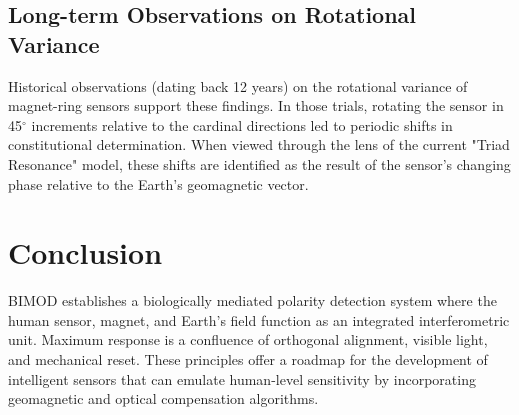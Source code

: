 \documentclass[12pt]{article}
\begin{document}
\subsection{Long-term Observations on Rotational Variance}
Historical observations (dating back 12 years) on the rotational variance of magnet-ring sensors support these findings. In those trials, rotating the sensor in 45$^\circ$ increments relative to the cardinal directions led to periodic shifts in constitutional determination. When viewed through the lens of the current "Triad Resonance" model, these shifts are identified as the result of the sensor's changing phase relative to the Earth's geomagnetic vector.

\section{Conclusion}
BIMOD establishes a biologically mediated polarity detection system where the human sensor, magnet, and Earth's field function as an integrated interferometric unit. Maximum response is a confluence of orthogonal alignment, visible light, and mechanical reset. These principles offer a roadmap for the development of intelligent sensors that can emulate human-level sensitivity by incorporating geomagnetic and optical compensation algorithms.



\end{document}
